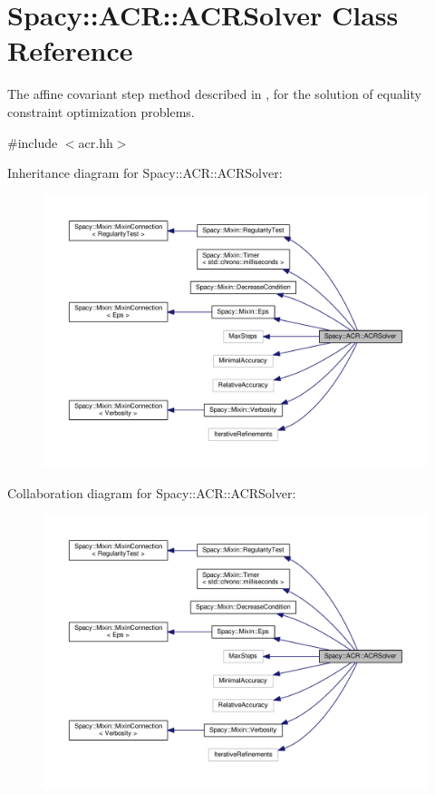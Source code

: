 \hypertarget{classSpacy_1_1ACR_1_1ACRSolver}{}\section{Spacy\+:\+:A\+CR\+:\+:A\+C\+R\+Solver Class Reference}
\label{classSpacy_1_1ACR_1_1ACRSolver}


The affine covariant step method described in \cite{Lubkoll2015}, \cite{Lubkoll2015a} for the solution of equality constraint optimization problems.  




{\ttfamily \#include $<$acr.\+hh$>$}



Inheritance diagram for Spacy\+:\+:A\+CR\+:\+:A\+C\+R\+Solver\+:
\nopagebreak
\begin{figure}[H]
\begin{center}
\leavevmode
\includegraphics[width=350pt]{classSpacy_1_1ACR_1_1ACRSolver__inherit__graph}
\end{center}
\end{figure}


Collaboration diagram for Spacy\+:\+:A\+CR\+:\+:A\+C\+R\+Solver\+:
\nopagebreak
\begin{figure}[H]
\begin{center}
\leavevmode
\includegraphics[width=350pt]{classSpacy_1_1ACR_1_1ACRSolver__coll__graph}
\end{center}
\end{figure}
